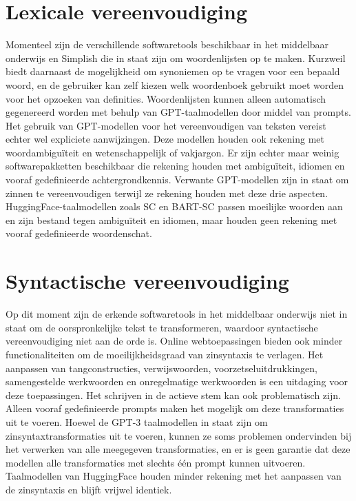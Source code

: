 \section{Lexicale vereenvoudiging}

Momenteel zijn de verschillende softwaretools beschikbaar in het middelbaar onderwijs en Simplish die in staat zijn om woordenlijsten op te maken. Kurzweil biedt daarnaast de mogelijkheid om synoniemen op te vragen voor een bepaald woord, en de gebruiker kan zelf kiezen welk woordenboek gebruikt moet worden voor het opzoeken van definities. Woordenlijsten kunnen alleen automatisch gegenereerd worden met behulp van GPT-taalmodellen door middel van prompts. Het gebruik van GPT-modellen voor het vereenvoudigen van teksten vereist echter wel expliciete aanwijzingen. Deze modellen houden ook rekening met woordambiguïteit en wetenschappelijk of vakjargon. Er zijn echter maar weinig softwarepakketten beschikbaar die rekening houden met ambiguïteit, idiomen en vooraf gedefinieerde achtergrondkennis. Verwante GPT-modellen zijn in staat om zinnen te vereenvoudigen terwijl ze rekening houden met deze drie aspecten. HuggingFace-taalmodellen zoals SC en BART-SC passen moeilijke woorden aan en zijn bestand tegen ambiguïteit en idiomen, maar houden geen rekening met vooraf gedefinieerde woordenschat.

\section{Syntactische vereenvoudiging}

Op dit moment zijn de erkende softwaretools in het middelbaar onderwijs niet in staat om de oorspronkelijke tekst te transformeren, waardoor syntactische vereenvoudiging niet aan de orde is. Online webtoepassingen bieden ook minder functionaliteiten om de moeilijkheidsgraad van zinsyntaxis te verlagen. Het aanpassen van tangconstructies, verwijswoorden, voorzetseluitdrukkingen, samengestelde werkwoorden en onregelmatige werkwoorden is een uitdaging voor deze toepassingen. Het schrijven in de actieve stem kan ook problematisch zijn. Alleen vooraf gedefinieerde prompts maken het mogelijk om deze transformaties uit te voeren. Hoewel de GPT-3 taalmodellen in staat zijn om zinsyntaxtransformaties uit te voeren, kunnen ze soms problemen ondervinden bij het verwerken van alle meegegeven transformaties, en er is geen garantie dat deze modellen alle transformaties met slechts één prompt kunnen uitvoeren. Taalmodellen van HuggingFace houden minder rekening met het aanpassen van de zinsyntaxis en blijft vrijwel identiek.

